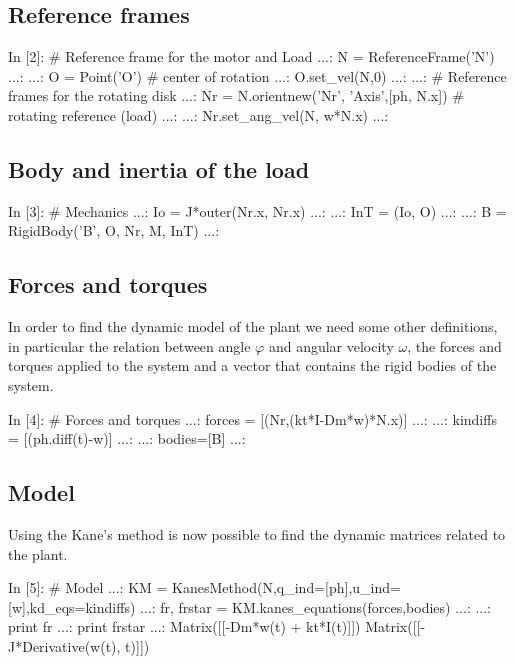 \subsection{Reference frames}
\begin{code}
In [2]: # Reference frame for the motor and Load
   ...: N = ReferenceFrame('N')
   ...: 
   ...: O = Point('O')		# center of rotation
   ...: O.set_vel(N,0)
   ...: 
   ...: # Reference frames for the rotating disk
   ...: Nr = N.orientnew('Nr', 'Axis',[ph, N.x])    # rotating reference (load)
   ...: 
   ...: Nr.set_ang_vel(N, w*N.x)
   ...: 
\end{code}

\subsection{Body and inertia of the load}
\begin{code}
In [3]: # Mechanics
   ...: Io = J*outer(Nr.x, Nr.x)
   ...: 
   ...: InT = (Io, O)
   ...: 
   ...: B = RigidBody('B', O, Nr, M, InT)
   ...: 
\end{code}

\subsection{Forces and torques}
In order to find the dynamic model of the plant we need some other definitions, 
in particular the relation between angle $\varphi$ and angular velocity 
$\omega$, the forces and torques applied to the system and a vector that 
contains the rigid bodies of the system.

\begin{code}
In [4]: # Forces and torques
   ...: forces = [(Nr,(kt*I-Dm*w)*N.x)]
   ...: 
   ...: kindiffs = [(ph.diff(t)-w)]
   ...: 
   ...: bodies=[B]
   ...: 
\end{code}

\subsection{Model}

Using the Kane's method is now possible to find the dynamic matrices related to 
the plant.

\begin{code}
In [5]: # Model
   ...: KM = KanesMethod(N,q_ind=[ph],u_ind=[w],kd_eqs=kindiffs)
   ...: fr, frstar = KM.kanes_equations(forces,bodies)
   ...: 
   ...: print fr
   ...: print frstar
   ...: 
Matrix([[-Dm*w(t) + kt*I(t)]])
Matrix([[-J*Derivative(w(t), t)]])
\end{code}

